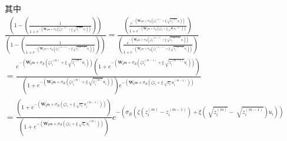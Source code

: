 \documentclass[12pt,a4paper]{article}
\begin{document}
\begin{CJK}{UTF8}{bkai}
\begin{align*}
&\mbox{其中}\\[3mm]
 & \frac{\left(1-\left( \frac{1}{1+e^{-(\bm{W_i^\prime}\bm{\alpha}+\sigma_R(\zeta z_i^{(m)}+\xi \sqrt[]{z_i^{(m)}} u_i))}} \right)\right)}{\left(1-\left( \frac{1}{1+e^{-(\bm{W_i^\prime}\bm{\alpha}+\sigma_R(\zeta z_i^{(m-1)}+\xi \sqrt[]{z_i^{(m-1)}} u_i))}} \right)\right)} = \frac{\left(\frac{e^{-(\bm{W_i^\prime}\bm{\alpha}+\sigma_R(\zeta z_i^{(m)}+\xi \sqrt[]{z_i^{(m)}} u_i))}}{1+e^{-(\bm{W_i^\prime}\bm{\alpha}+\sigma_R(\zeta z_i+\xi \sqrt[]{z_i} u_i^{(m)}))}}\right)}{\left(\frac{e^{-(\bm{W_i^\prime}\bm{\alpha}+\sigma_R(\zeta z_i^{(m-1)}+\xi \sqrt[]{z_i^{(m-1)}} u_i))}}{1+e^{-(\bm{W_i^\prime}\bm{\alpha}+\sigma_R(\zeta z_i^{(m-1)}+\xi \sqrt[]{z_i^{(m-1)}} u_i))}}\right)} \\[3mm]
 & =
\frac{e^{-(\bm{W_i^\prime}\bm{\alpha}+\sigma_R(\zeta z_i^{(m)}+\xi \sqrt[]{z_i^{(m)}} u_i))}\left(1+e^{-(\bm{W_i^\prime}\bm{\alpha}+\sigma_R(\zeta z_i^{(m-1)}+\xi \sqrt[]{z_i^{(m-1)}} u_i))}\right)}{\left(1+e^{-(\bm{W_i^\prime}\bm{\alpha}+\sigma_R(\zeta z_i^{(m)}+\xi \sqrt[]{z_i^{(m)}} u_i))}\right)e^{-(\bm{W_i^\prime}\bm{\alpha}+\sigma_R(\zeta z_i+\xi \sqrt[]{z_i} u_i^{(m-1)}))}} \\[3mm]
 & =
\frac{\left(1+e^{-(\bm{W_i^\prime}\bm{\alpha}+\sigma_R(\zeta z_i+\xi \sqrt[]{z_i} u_i^{(m-1)}))}\right)}{\left(1+e^{-(\bm{W_i^\prime}\bm{\alpha}+\sigma_R(\zeta z_i+\xi \sqrt[]{z_i} u_i^{(m)}))}\right)}e^{-\left(\sigma_R\left(\zeta (z_i^{(m)}-z_i^{(m-1)})+\xi (\sqrt[]{z_i^{(m)}}-\sqrt[]{z_i^{(m-1)}}) u_i\right)\right)}
\end{align*}
\newpage

\end{CJK}
\end{document}
